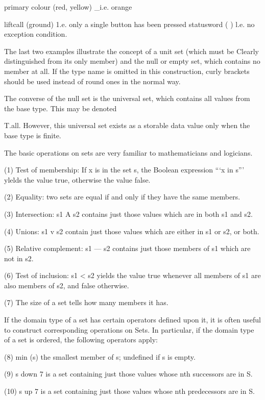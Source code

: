 {{{			primary colour (red, yellow) _i.e. orange
			
			liftcall (ground) 1.e. only a single button has been pressed statusword ( ) l.e. no exception condition.
			
			The last two examples illustrate the concept of a unit set (which must be Clearly distinguished from its only member) and the null or empty set, which contains no member at all. If the type name is omitted in this construction, curly brackets should be used instead of round ones in the normal way.
			
			The converse of the null set is the universal set, which contains all values from the base type. This may be denoted
			
			T.all. However, this universal set exists as a storable data value only when the base type is finite.
			
			The basic operations on sets are very familiar to mathematicians and logicians.
			
			(1) Test of membership: If x is in the set s, the Boolean expression “‘x in s”’ ylelds the value true, otherwise the value false.
			
			(2) Equality: two sets are equal if and only if they have the same members.
			
			(3) Intersection: s1 A s2 contains just those values which are in both s1 and s2.
			
			(4) Unions: s1 v s2 contain just those values which are either in s1 or s2, or both.
			
			(5) Relative complement: s1 — s2 contains just those members of s1 which are not in s2.
			
			(6) Test of inclusion: s1 < s2 yields the value true whenever all members of s1 are also members of s2, and false otherwise.
			
			(7) The size of a set tells how many members it has.
			
			If the domain type of a set has certain operators defined upon it, it is often useful to construct corresponding operations on Sets. In particular, if the domain type of a set is ordered, the following operators apply:
			
			(8) min (s) the smallest member of s; undefined if s is empty.
			
			(9) s down 7 is a set containing just those values whose nth successors are in S.
			
			(10) s up 7 is a set containing just those values whose nth predecessors are in S.
			
}}}
